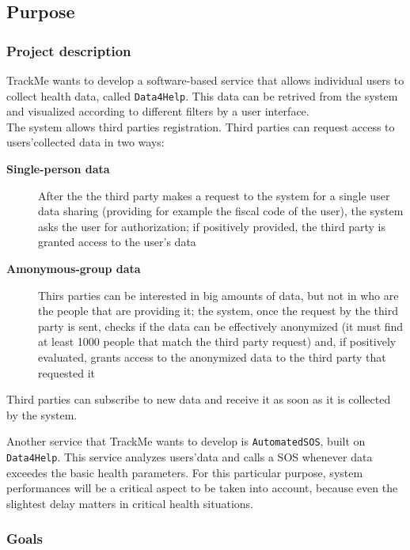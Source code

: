 \documentclass[12pt]{article}
\begin{document}
  \subsection{Purpose}

      \subsubsection{Project description}

        TrackMe wants to develop a software-based service that allows individual users to collect health data, called \texttt{Data4Help}. This data can be retrived from the system and visualized according to different filters by a user interface. \\
        The system allows third parties registration. Third parties can request access to users'collected data in two ways:

        \begin{description}
          \item [\textbf{Single-person data}] After the the third party makes a request to the system for a single user data sharing (providing for example the fiscal code of the user), the system asks the user for authorization; if positively provided, the third party is granted access to the user's data
          \item [\textbf{Amonymous-group data}] Thirs parties can be interested in big amounts of data, but not in who are the people that are providing it; the system, once the request by the third party is sent, checks if the data can be effectively anonymized (it must find at least 1000 people that match the third party request) and, if positively evaluated, grants access to the anonymized data to the third party that requested it
        \end{description}

        Third parties can subscribe to new data and receive it as soon as it is collected by the system.

        Another service that TrackMe wants to develop is \texttt{AutomatedSOS}, built on \texttt{Data4Help}. This service analyzes users'data and calls a SOS whenever data exceedes the basic health parameters. For this particular purpose, system performances will be a critical aspect to be taken into account, because even the slightest delay matters in critical health situations.

      \subsubsection{Goals}
\end{document}
